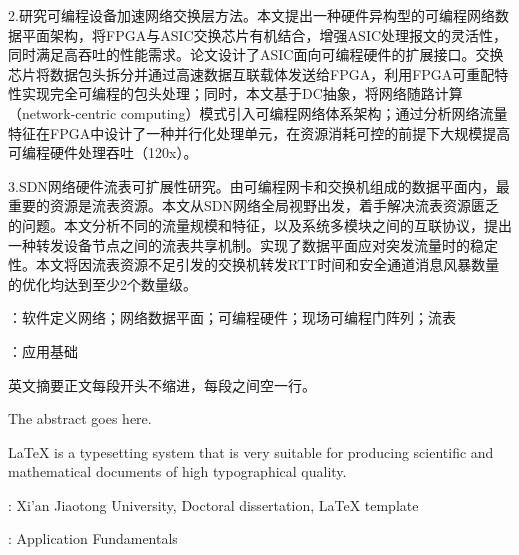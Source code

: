 2.研究可编程设备加速网络交换层方法。本文提出一种硬件异构型的可编程网络数据平面架构，将FPGA与ASIC交换芯片有机结合，增强ASIC处理报文的灵活性，同时满足高吞吐的性能需求。论文设计了ASIC面向可编程硬件的扩展接口。交换芯片将数据包头拆分并通过高速数据互联载体发送给FPGA，利用FPGA可重配特性实现完全可编程的包头处理；同时，本文基于DC抽象，将网络随路计算（network-centric computing）模式引入可编程网络体系架构；通过分析网络流量特征在FPGA中设计了一种并行化处理单元，在资源消耗可控的前提下大规模提高可编程硬件处理吞吐（120x）。

3.SDN网络硬件流表可扩展性研究。由可编程网卡和交换机组成的数据平面内，最重要的资源是流表资源。本文从SDN网络全局视野出发，着手解决流表资源匮乏的问题。本文分析不同的流量规模和特征，以及系统多模块之间的互联协议，提出一种转发设备节点之间的流表共享机制。实现了数据平面应对突发流量时的稳定性。本文将因流表资源不足引发的交换机转发RTT时间和安全通道消息风暴数量的优化均达到至少2个数量级。



{\boldsong}
\vspace{\baselineskip}
：软件定义网络；网络数据平面；可编程硬件；现场可编程门阵列；流表

\vspace{\baselineskip}
：应用基础


\clearpage


\noindent 英文摘要正文每段开头不缩进，每段之间空一行。\newline

\noindent The abstract goes here. \newline

\noindent \LaTeX{} is a typesetting system that is very suitable for producing scientific and mathematical documents of high typographical quality.


\vspace{\baselineskip}
: Xi'an Jiaotong University, Doctoral dissertation, \LaTeX{} template

\vspace{\baselineskip}
: Application Fundamentals

\clearpage
